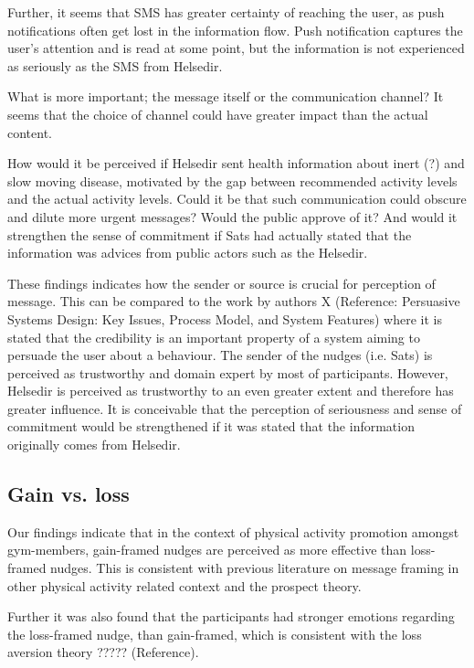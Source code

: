 Further, it seems that SMS has greater certainty of reaching the user, as push notifications often get lost in the information flow. Push notification captures the user's attention and is read at some point, but the information is not experienced as seriously as the SMS from Helsedir. 

What is more important; the message itself or the communication channel? It seems that the choice of channel could have greater impact than the actual content. 

How would it be perceived if Helsedir sent health information about inert (?) and slow moving disease, motivated by the gap between recommended activity levels and the actual activity levels. Could it be that such communication could obscure and dilute more urgent messages? Would the public approve of it? And would it strengthen the sense of commitment if Sats had actually stated that the information was advices from public actors such as the Helsedir. 

These findings indicates how the sender or source is crucial for perception of message. This can be compared to the work by authors X \cite{oinas-kukkonen_persuasive_2009} (Reference: Persuasive Systems Design: Key Issues, Process Model, and System Features) where it is stated that the credibility is an important property of a system aiming to persuade the user about a behaviour. The sender of the nudges (i.e. Sats) is perceived as trustworthy and domain expert by most of participants. However, Helsedir is perceived as trustworthy to an even greater extent and therefore has greater influence. It is conceivable that the perception of seriousness and sense of commitment would be strengthened if it was stated that the information originally comes from Helsedir. 

\subsection{Gain vs. loss}
Our findings indicate that in the context of physical activity promotion amongst gym-members, gain-framed nudges are perceived as more effective than loss-framed nudges. This is consistent with previous literature on message framing in other physical activity related context and the prospect theory. 

Further it was also found that the participants had stronger emotions regarding the loss-framed nudge, than gain-framed, which is consistent with the loss aversion theory ????? (Reference). 

